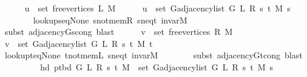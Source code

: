 \begin{isabellebody}
\ \ \ \ \isamarkupfalse%
\ {\isachardoublequoteopen}u\ {\isasymin}\ set\ {\isacharparenleft}{\kern0pt}free{\isacharunderscore}{\kern0pt}vertices\ L\ M{\isacharparenright}{\kern0pt}{\isachardoublequoteclose}\isanewline
\ \ \ \ \isamarkupfalse%
\ {\isachardoublequoteopen}u\ {\isasymin}\ set\ {\isacharparenleft}{\kern0pt}G{\isachardot}{\kern0pt}adjacency{\isacharunderscore}{\kern0pt}list\ {\isacharparenleft}{\kern0pt}G{}\ L\ R\ s\ t\ M{\isacharparenright}{\kern0pt}\ s{\isacharparenright}{\kern0pt}{\isachardoublequoteclose}\isanewline
\ \ \ \ \ \ \isamarkupfalse%
\ lookup{\isacharunderscore}{\kern0pt}s{\isacharunderscore}{\kern0pt}eq{\isacharunderscore}{\kern0pt}None\ s{\isacharunderscore}{\kern0pt}not{\isacharunderscore}{\kern0pt}mem{\isacharunderscore}{\kern0pt}R\ s{\isacharunderscore}{\kern0pt}neq{\isacharunderscore}{\kern0pt}t\ invar{\isacharunderscore}{\kern0pt}M\isanewline
\ \ \ \ \ \ \isamarkupfalse%
\ {\isacharparenleft}{\kern0pt}subst\ adjacency{\isacharunderscore}{\kern0pt}G{}{\isacharunderscore}{\kern0pt}s{\isacharunderscore}{\kern0pt}cong{\isacharparenright}{\kern0pt}\ blast{\isacharplus}{\kern0pt}\isanewline
\ \ \ \ \isamarkupfalse%
\ {\isachardoublequoteopen}v\ {\isasymin}\ set\ {\isacharparenleft}{\kern0pt}free{\isacharunderscore}{\kern0pt}vertices\ R\ M{\isacharparenright}{\kern0pt}{\isachardoublequoteclose}\isanewline
\ \ \ \ \isamarkupfalse%
\ {\isachardoublequoteopen}v\ {\isasymin}\ set\ {\isacharparenleft}{\kern0pt}G{\isachardot}{\kern0pt}adjacency{\isacharunderscore}{\kern0pt}list\ {\isacharparenleft}{\kern0pt}G{}\ L\ R\ s\ t\ M{\isacharparenright}{\kern0pt}\ t{\isacharparenright}{\kern0pt}{\isachardoublequoteclose}\isanewline
\ \ \ \ \ \ \isamarkupfalse%
\ lookup{\isacharunderscore}{\kern0pt}t{\isacharunderscore}{\kern0pt}eq{\isacharunderscore}{\kern0pt}None\ t{\isacharunderscore}{\kern0pt}not{\isacharunderscore}{\kern0pt}mem{\isacharunderscore}{\kern0pt}L\ s{\isacharunderscore}{\kern0pt}neq{\isacharunderscore}{\kern0pt}t\ invar{\isacharunderscore}{\kern0pt}M\isanewline
\ \ \ \ \ \ \isamarkupfalse%
\ {\isacharparenleft}{\kern0pt}subst\ adjacency{\isacharunderscore}{\kern0pt}G{}{\isacharunderscore}{\kern0pt}t{\isacharunderscore}{\kern0pt}cong{\isacharparenright}{\kern0pt}\ blast{\isacharplus}{\kern0pt}\isanewline
\ \ \isamarkupfalse%
\isanewline
\ \ \isamarkupfalse%
\isanewline
\ \ \ \ {\isachardoublequoteopen}hd\ {\isacharparenleft}{\kern0pt}p{\isacharunderscore}{\kern0pt}tbd\ G\ L\ R\ s\ t\ M{\isacharparenright}{\kern0pt}\ {\isasymin}\ set\ {\isacharparenleft}{\kern0pt}G{\isachardot}{\kern0pt}adjacency{\isacharunderscore}{\kern0pt}list\ {\isacharparenleft}{\kern0pt}G{}\ L\ R\ s\ t\ M{\isacharparenright}{\kern0pt}\ s{\isacharparenright}{\kern0pt}{\isachardoublequoteclose}\isanewline

\end{isabellebody}
